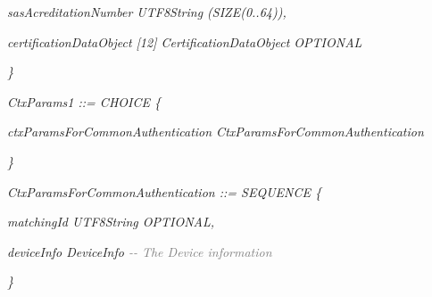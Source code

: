 \documentclass[10pt, oneside]{book}
\begin{document}
\hspace{0.75cm} \textit{sasAcreditationNumber UTF8String (SIZE(0..64)),}

\hspace{0.75cm} \textit{certificationDataObject [12] CertificationDataObject OPTIONAL}

\textit{\}\\}

\textit{CtxParams1 ::= CHOICE \{}

\hspace{0.75cm} \textit{ctxParamsForCommonAuthentication CtxParamsForCommonAuthentication}

\textit{\}\\}

\textit{CtxParamsForCommonAuthentication ::= SEQUENCE \{}

\hspace{0.75cm} \textit{matchingId UTF8String OPTIONAL,}

\hspace{0.75cm} \textit{deviceInfo DeviceInfo \textcolor{gray}{{-}{-} The Device information}}

\textit{\}\\}
\end{document}
